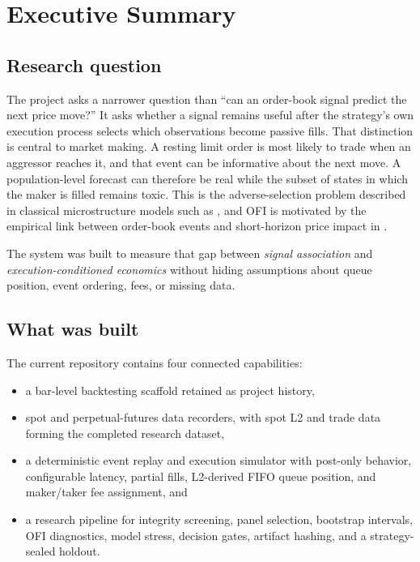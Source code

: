 \section{Executive Summary}

\subsection{Research question}

The project asks a narrower question than ``can an order-book signal predict
the next price move?'' It asks whether a signal remains useful after the
strategy's own execution process selects which observations become passive
fills. That distinction is central to market making. A resting limit order is
most likely to trade when an aggressor reaches it, and that event can be
informative about the next move. A population-level forecast can therefore be
real while the subset of states in which the maker is filled remains toxic.
This is the adverse-selection problem described in classical microstructure
models such as \citet{glosten1985}, and OFI is motivated by the empirical link
between order-book events and short-horizon price impact in
\citet{cont2014}.

The system was built to measure that gap between \emph{signal association} and
\emph{execution-conditioned economics} without hiding assumptions about queue
position, event ordering, fees, or missing data.

\subsection{What was built}

The current repository contains four connected capabilities:

\begin{itemize}
  \item a bar-level backtesting scaffold retained as project history,
  \item spot and perpetual-futures data recorders, with spot L2 and trade data
        forming the completed research dataset,
  \item a deterministic event replay and execution simulator with post-only
        behavior, configurable latency, partial fills, L2-derived FIFO queue
        position, and maker/taker fee assignment, and
  \item a research pipeline for integrity screening, panel selection,
        bootstrap intervals, OFI diagnostics, model stress, decision gates,
        artifact hashing, and a strategy-sealed holdout.
\end{itemize}

